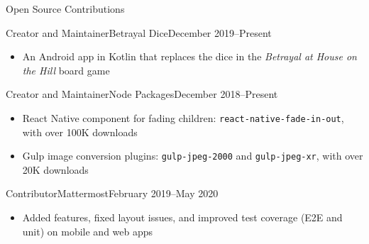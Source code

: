 \documentclass[]{mcdowellcv}
\begin{document}
	\begin{cvsection}{Open Source Contributions}
		\begin{cvsubsection}{Creator and Maintainer}{Betrayal Dice}{December 2019--Present}
			\begin{itemize}
				\item An Android app in Kotlin that replaces the dice in the \textit{Betrayal at House on the Hill} board game
			\end{itemize}
		\end{cvsubsection}
		
		\begin{cvsubsection}{Creator and Maintainer}{Node Packages}{December 2018--Present}
			\begin{itemize}
				\item React Native component for fading children: \texttt{react-native-fade-in-out}, with over 100K downloads
				\item Gulp image conversion plugins: \texttt{gulp-jpeg-2000} and \texttt{gulp-jpeg-xr}, with over 20K downloads
			\end{itemize}
		\end{cvsubsection}	

		\begin{cvsubsection}{Contributor}{Mattermost}{February 2019--May 2020}
			\begin{itemize}
				\item Added features, fixed layout issues, and improved test coverage (E2E and unit) on mobile and web apps
			\end{itemize}
		\end{cvsubsection}
	\end{cvsection}
	
\end{document}
